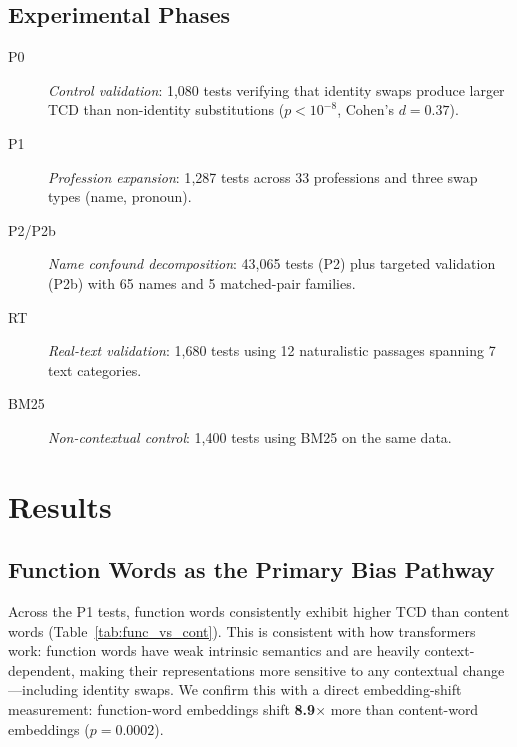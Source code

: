\documentclass[11pt]{article}
\begin{document}
\subsection{Experimental Phases}

\begin{description}
\item[P0] \emph{Control validation}: 1{,}080 tests verifying that identity swaps produce larger TCD than non-identity substitutions ($p < 10^{-8}$, Cohen's $d = 0.37$).

\item[P1] \emph{Profession expansion}: 1{,}287 tests across 33 professions and three swap types (name, pronoun).

\item[P2/P2b] \emph{Name confound decomposition}: 43{,}065 tests (P2) plus targeted validation (P2b) with 65 names and 5 matched-pair families.

\item[RT] \emph{Real-text validation}: 1{,}680 tests using 12 naturalistic passages spanning 7 text categories.

\item[BM25] \emph{Non-contextual control}: 1{,}400 tests using BM25 on the same data.
\end{description}


\section{Results}
\label{sec:results}

\subsection{Function Words as the Primary Bias Pathway}
\label{sec:results:funcword}

Across the P1 tests, function words consistently exhibit higher TCD than content words (Table~\ref{tab:func_vs_cont}). This is consistent with how transformers work: function words have weak intrinsic semantics and are heavily context-dependent, making their representations more sensitive to any contextual change---including identity swaps. We confirm this with a direct embedding-shift measurement: function-word embeddings shift \textbf{8.9$\times$} more than content-word embeddings ($p = 0.0002$).
\end{document}
